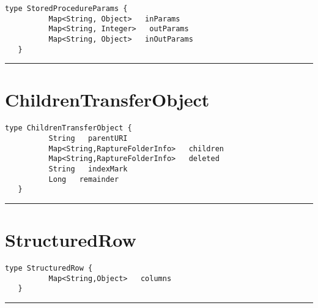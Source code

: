 \begin{lstlisting}[style=nonumbers]
   type StoredProcedureParams {
          Map<String, Object>   inParams
          Map<String, Integer>   outParams
          Map<String, Object>   inOutParams
   }
\end{lstlisting}

\rule{12cm}{2pt}
\section{ChildrenTransferObject}
\label{type:ChildrenTransferObject}

\begin{lstlisting}[style=nonumbers]
   type ChildrenTransferObject {
          String   parentURI
          Map<String,RaptureFolderInfo>   children
          Map<String,RaptureFolderInfo>   deleted
          String   indexMark
          Long   remainder
   }
\end{lstlisting}

\rule{12cm}{2pt}
\section{StructuredRow}
\label{type:StructuredRow}

\begin{lstlisting}[style=nonumbers]
   type StructuredRow {
          Map<String,Object>   columns
   }
\end{lstlisting}

\rule{12cm}{2pt}
